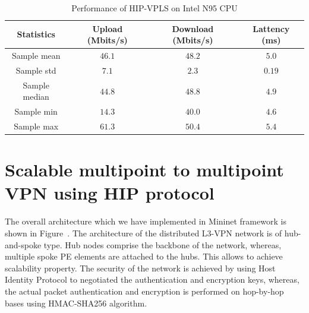 \begin{table}
    \centering
    \begin{tabular}{|c|c|c|c|}
    \hline
    Statistics     & Upload (Mbits/s)        & Download (Mbits/s)     & Lattency (ms) \\\hline
    Sample mean    & $46.1$                  & $48.2$                 & $5.0$         \\
    Sample std     & $7.1$                   & $2.3$                  & $0.19$        \\
    Sample median  & $44.8$                  & $48.8$                 & $4.9$         \\
    Sample min     & $14.3$                  & $40.0$                 & $4.6$         \\
    Sample max     & $61.3$                  & $50.4$                 & $5.4$         \\
    \hline
    \end{tabular}
    \caption{Performance of HIP-VPLS on Intel N95 CPU}  
    \label{tab:binary}
\end{table}




\section{Scalable multipoint to multipoint VPN using HIP protocol}

The overall architecture which we have implemented in
Mininet framework is shown in Figure~\cite{fig:l3vpn}. The architecture
of the distributed L3-VPN network is of hub-and-spoke type.
Hub nodes comprise the backbone of the network, whereas,
multiple spoke PE elements are attached to the hubs. This
allows to achieve scalability property. The security of the 
network is achieved by using Host Identity Protocol to negotiated
the authentication and encryption keys, whereas, the actual packet authentication
and encryption is performed on hop-by-hop bases using HMAC-SHA256
algorithm. 

